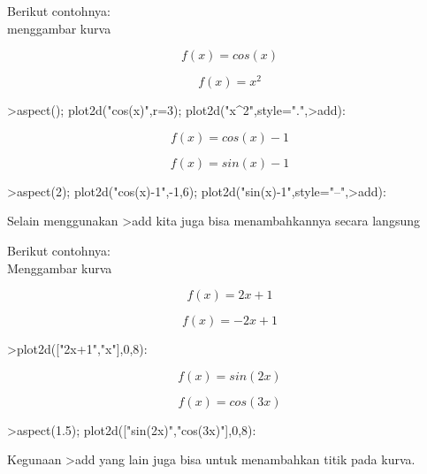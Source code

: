 \documentclass[a4paper,10pt]{article}
\begin{document}
\begin{eulernotebook}
\begin{eulercomment}
\begin{eulercomment}
\begin{eulercomment}
\begin{eulercomment}
\begin{eulercomment}
Berikut contohnya:\\
menggambar kurva\\
\end{eulercomment}
\begin{eulerformula}
\[
 f(x)=cos(x)
\]
\end{eulerformula}
\begin{eulerformula}
\[
f(x)= x^2
\]
\end{eulerformula}
\begin{eulerprompt}
>aspect(); plot2d("cos(x)",r=3); plot2d("x^2",style=".",>add):
\end{eulerprompt}
\begin{eulerformula}
\[
f(x)=cos(x)-1
\]
\end{eulerformula}
\begin{eulerformula}
\[
f(x)= sin(x)-1
\]
\end{eulerformula}
\begin{eulerprompt}
>aspect(2); plot2d("cos(x)-1",-1,6); plot2d("sin(x)-1",style="--",>add):
\end{eulerprompt}
\begin{eulercomment}
Selain menggunakan \textgreater{}add kita juga bisa menambahkannya secara langsung

Berikut contohnya:\\
Menggambar kurva\\
\end{eulercomment}
\begin{eulerformula}
\[
f(x)= 2x+1
\]
\end{eulerformula}
\begin{eulerformula}
\[
f(x)= -2x+1
\]
\end{eulerformula}
\begin{eulerprompt}
>plot2d(["2x+1","x"],0,8):
\end{eulerprompt}
\begin{eulerformula}
\[
f(x)=sin(2x)
\]
\end{eulerformula}
\begin{eulerformula}
\[
f(x)=cos(3x)
\]
\end{eulerformula}
\begin{eulerprompt}
>aspect(1.5); plot2d(["sin(2x)","cos(3x)"],0,8):
\end{eulerprompt}
\begin{eulercomment}
Kegunaan \textgreater{}add yang lain juga bisa untuk menambahkan titik pada kurva.


\end{eulercomment}
\end{eulercomment}
\end{eulercomment}
\end{eulercomment}
\end{eulercomment}
\end{eulernotebook}
\end{document}

